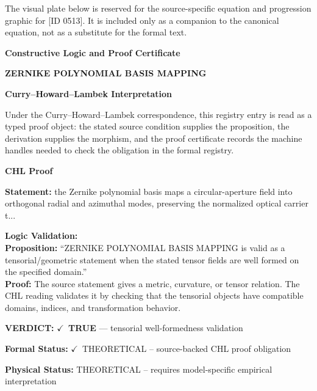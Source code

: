 \begingroup\footnotesize\sloppy
The visual plate below is reserved for the source-specific equation and progression graphic for [ID 0513]. It is included only as a companion to the canonical equation, not as a substitute for the formal text.
\par\endgroup
\ifTZPDarkEdition
{}
\fi

\clearpage
\begingroup\tzpsupportsetup
\noindent\textbf{\fontsize{10.8pt}{12.8pt}\selectfont [ID 0513] Constructive Logic and Proof Certificate}\par
\noindent\textbf{\fontsize{10pt}{12pt}\selectfont ZERNIKE POLYNOMIAL BASIS MAPPING}\par
\vspace{0.45em}
\begingroup
\footnotesize
\setlength{\parskip}{0.22em}
\setlength{\parindent}{0pt}
\noindent\textbf{Curry--Howard--Lambek Interpretation}\par
Under the Curry--Howard--Lambek correspondence, this registry entry is read as a typed proof
object: the stated source condition supplies the proposition, the derivation supplies the
morphism, and the proof certificate records the machine handles needed to check the obligation
in the formal registry.

\vspace{0.45em}
\noindent\textbf{CHL Proof}\par
\textbf{Statement:} the Zernike polynomial basis maps a circular-aperture field into orthogonal radial and
azimuthal modes, preserving the normalized optical carrier t...

\textbf{Logic Validation:}\\
\textbf{Proposition:} ``ZERNIKE POLYNOMIAL BASIS MAPPING is valid as a tensorial/geometric statement when the
stated tensor fields are well formed on the specified domain.''\\
\textbf{Proof:} The source statement gives a metric, curvature, or tensor relation. The CHL reading
validates it by checking that the tensorial objects have compatible domains, indices,
and transformation behavior.

\textbf{VERDICT:} \ensuremath{\checkmark}\ \textbf{TRUE} --- tensorial well-formedness validation

\textbf{Formal Status:} \ensuremath{\checkmark}\ THEORETICAL -- source-backed CHL proof obligation

\textbf{Physical Status:} THEORETICAL -- requires model-specific empirical interpretation
\par\vspace{0.45em}
\par
\ifTZPDarkEdition
{}
\fi
\endgroup
\endgroup
